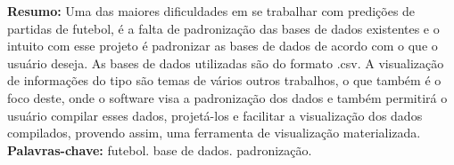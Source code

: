 \begin{singlespace}
\textbf{Resumo: }
Uma das maiores dificuldades em se trabalhar com predições de partidas de futebol, é a falta de padronização das bases de dados existentes e o intuito com esse projeto é padronizar as bases de dados de acordo com o que o usuário deseja. As bases de dados utilizadas são do formato .csv. A visualização de informações do tipo são temas de vários outros trabalhos, o que também é o foco deste, onde o software visa a padronização dos dados e também permitirá o usuário compilar esses dados, projetá-los e facilitar a visualização dos dados compilados, provendo assim, uma ferramenta de visualização materializada.\\
\textbf{Palavras-chave: }
futebol. base de dados. padronização.
\end{singlespace}
